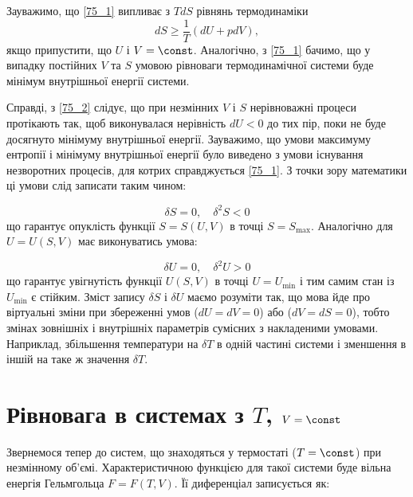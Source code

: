 Зауважимо, що \eqref{75_1} випливає з $TdS$ рівнянь термодинаміки
\begin{equation} \label{75_2}
dS \ge \frac{1}{T}(dU + p dV),
\end{equation}
%
якщо припустити, що $U$ і $V = \const$. Аналогічно, з \eqref{75_1} бачимо, що у випадку постійних $V$ та $S$ умовою рівноваги термодинамічної системи буде мінімум внутрішньої енергії системи.

Справді, з \eqref{75_2} слідує, що при незмінних $V$ і $S$ нерівноважні процеси протікають так, щоб виконувалася нерівність $dU < 0$ до тих пір, поки не буде досягнуто мінімуму внутрішньої енергії. Зауважимо, що умови максимуму ентропії і мінімуму внутрішньої енергії було виведено з умови існування незворотних процесів, для котрих справджується \eqref{75_1}. З точки зору математики ці умови слід записати таким чином:

\begin{equation} \label{76_3}
\delta S = 0, \quad \delta^2 S < 0
\end{equation}
%
що гарантує опуклість функції $S = S(U,V)$ в точці $S = S_{\max}$. Аналогічно для $U = U(S,V)$ має виконуватись умова:

\begin{equation} \label{76_4}
\delta U = 0, \quad \delta^2 U > 0
\end{equation}
%
що гарантує увігнутість функції $U(S,V)$ в точці $U = U_{\min}$ і тим самим стан із $U_{\min}$ є стійким. Зміст запису $\delta S$ і $\delta U$ маємо розуміти так, що мова йде про віртуальні зміни при збереженні умов ($dU = dV = 0$) або ($dV = dS = 0$), тобто змінах зовнішніх і внутрішніх параметрів сумісних з накладеними умовами. Наприклад, збільшення температури на $\delta T$ в одній частині системи і зменшення в іншій на таке ж значення $\delta T$.

\section{Рівновага в системах з %
\texorpdfstring{$T$, $V = \const$}{T, V = const}
}

Звернемося тепер до систем, що знаходяться у термостаті ($T = \const$) при незмінному об'ємі. Характеристичною функцією для такої системи буде вільна енергія Гельмгольца $F = F(T,V)$. Її диференціал записується як:

